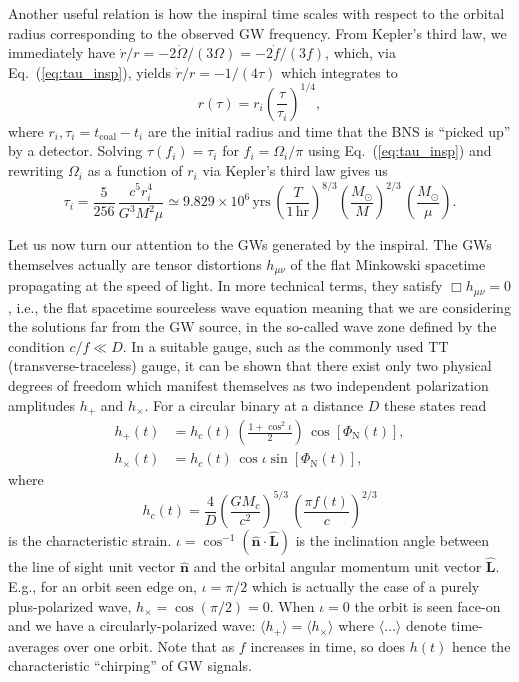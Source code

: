 \documentclass[amsmath,amssymb,aps,floats,amsfonts,notitlepage,superscriptaddress,eqsecnum,nofootinbib,10pt]{revtex4-1}
\newcommand{\f}{\frac}
\newcommand{\be}{\begin{equation}}
\newcommand{\ee}{\end{equation}}
\begin{document}
Another useful relation is how the inspiral time scales with respect to the orbital radius corresponding to the observed GW frequency.
From Kepler's third law, we immediately have $\dot{r}/r= -2\dot{\Omega}/(3\Omega)=-2\dot{f}/(3f)$, which, via Eq.~(\ref{eq:tau_insp}),
yields $\dot{r}/r= -1/(4\tau)$ which integrates to
%
\be
r(\tau)=r_i \left(\f{\tau}{\tau_i}\right)^{1/4}\label{eq:r_of_tau},
\ee
%
where $r_i, \tau_i=t_\text{coal}-t_i$ are the initial radius and time that the BNS
is ``picked up'' by a detector. Solving $\tau(f_i)=\tau_i$ for $f_i=\Omega_i/\pi$ using Eq.~(\ref{eq:tau_insp}) and rewriting $\Omega_i$ as a function of $r_i$ via
Kepler's third law gives us
%
\be
\tau_i = \f{5}{256}\, \f{c^5 r_i^4}{G^3 M^2 \mu}\simeq 9.829\times 10^6\,\text{yrs}\, \left(\f{T}{1\,\text{hr}}\right)^{8/3} \left(\f{M_\odot}{M}\right)^{2/3}\,\left(\f{M_\odot}{\mu}\right) \label{eq:tau_of_r}.
\ee
%

Let us now turn our attention to the GWs generated by the inspiral.
The GWs themselves actually are tensor distortions $h_{\mu\nu}$ of the flat Minkowski
spacetime propagating at the speed of light.
In more technical terms, they satisfy $\Box h_{\mu\nu} = 0$, i.e., the flat spacetime sourceless wave equation
meaning that we are considering the solutions far from the GW source, in the so-called wave zone defined by the condition $ c/f \ll D$.
In a suitable gauge, such as the commonly used TT (transverse-traceless) gauge, it can be shown that
there exist only two physical degrees of freedom which manifest themselves
as two independent polarization amplitudes $h_+$ and $h_\times$. %
For a circular binary at a distance $D$ these states read
%
\begin{align}
 h_+(t) &= h_c(t)\, \left(\f{1+\cos^2\iota}{2}\right)\, \cos[\Phi_\text{N}(t)],\label{eq:hplus_TD}\\
 h_\times(t) & =h_c(t)\,\cos\iota \sin[\Phi_\text{N}(t)]\label{eq:hcross_TD},
\end{align}
%
%
where
%
\be
h_c(t) =\f{4}{D}\left(\f{G M_c}{c^2}\right)^{5/3}\, \left(\f{\pi f(t)}{c}\right)^{2/3} \label{eq:h_c}
\ee
is the characteristic strain.
$\iota=\cos^{-1}(\mathbf{\hat{n}}\cdot{\mathbf{\hat{L}}}) $ is the inclination angle between the line of sight unit vector $\mathbf{\hat{n}} $ and the orbital angular momentum unit vector $\mathbf{\hat{L}}$. 
E.g., for an orbit seen edge on, $\iota = \pi/2$ which is actually the case of a purely plus-polarized wave, $h_\times=\cos(\pi/2)=0$.
When $\iota=0$ the orbit is seen face-on and we have a circularly-polarized wave: $\langle h_+ \rangle = \langle h_\times\rangle$ where $\langle \ldots \rangle$
denote time-averages over one orbit. Note that as $f$ increases in time, so does $h(t)$ hence the characteristic ``chirping'' of GW signals.
\end{document}
